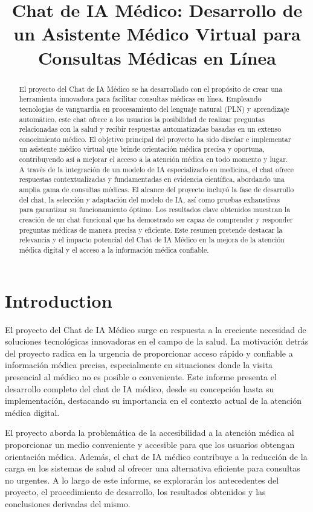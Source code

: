 \documentclass[conference]{IEEEtran}
\title{Chat de IA Médico: Desarrollo de un Asistente Médico Virtual para Consultas Médicas en Línea}
\author{\IEEEauthorblockN{Miguel Luis, Sebastian Rodriguez y Eddy Diaz}}
\begin{document}
\maketitle

\begin{abstract}
El proyecto del Chat de IA Médico se ha desarrollado con el propósito de crear una herramienta innovadora para facilitar consultas médicas en línea. Empleando tecnologías de vanguardia en procesamiento del lenguaje natural (PLN) y aprendizaje automático, este chat ofrece a los usuarios la posibilidad de realizar preguntas relacionadas con la salud y recibir respuestas automatizadas basadas en un extenso conocimiento médico. El objetivo principal del proyecto ha sido diseñar e implementar un asistente médico virtual que brinde orientación médica precisa y oportuna, contribuyendo así a mejorar el acceso a la atención médica en todo momento y lugar. A través de la integración de un modelo de IA especializado en medicina, el chat ofrece respuestas contextualizadas y fundamentadas en evidencia científica, abordando una amplia gama de consultas médicas. El alcance del proyecto incluyó la fase de desarrollo del chat, la selección y adaptación del modelo de IA, así como pruebas exhaustivas para garantizar su funcionamiento óptimo. Los resultados clave obtenidos muestran la creación de un chat funcional que ha demostrado ser capaz de comprender y responder preguntas médicas de manera precisa y eficiente. Este resumen pretende destacar la relevancia y el impacto potencial del Chat de IA Médico en la mejora de la atención médica digital y el acceso a la información médica confiable.
\end{abstract}

\section{Introduction}

El proyecto del Chat de IA Médico surge en respuesta a la creciente necesidad de soluciones tecnológicas innovadoras en el campo de la salud. La motivación detrás del proyecto radica en la urgencia de proporcionar acceso rápido y confiable a información médica precisa, especialmente en situaciones donde la visita presencial al médico no es posible o conveniente. Este informe presenta el desarrollo completo del chat de IA médico, desde su concepción hasta su implementación, destacando su importancia en el contexto actual de la atención médica digital.

El proyecto aborda la problemática de la accesibilidad a la atención médica al proporcionar un medio conveniente y accesible para que los usuarios obtengan orientación médica. Además, el chat de IA médico contribuye a la reducción de la carga en los sistemas de salud al ofrecer una alternativa eficiente para consultas no urgentes. A lo largo de este informe, se explorarán los antecedentes del proyecto, el procedimiento de desarrollo, los resultados obtenidos y las conclusiones derivadas del mismo.
\end{document}
